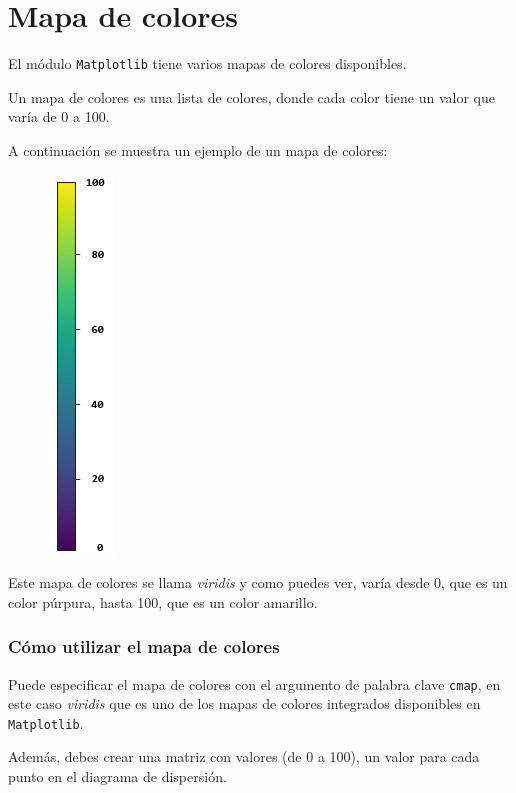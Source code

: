 \section{Mapa de colores}

El módulo \texttt{Matplotlib} tiene varios mapas de colores disponibles.

Un mapa de colores es una lista de colores, donde cada color tiene un
valor que varía de 0 a 100.

A continuación se muestra un ejemplo de un mapa de colores:
\begin{figure}
  \centering
  \includegraphics[scale=0.6]{img/img_colorbar.png}
\end{figure}


Este mapa de colores se llama
\emph{\textquotesingle viridis\textquotesingle{}} y como puedes ver,
varía desde 0, que es un color púrpura, hasta 100, que es un color
amarillo.

\subsubsection{Cómo utilizar el mapa de colores}

Puede especificar el mapa de colores con el argumento de palabra clave
\texttt{cmap}, en este caso
\emph{\textquotesingle viridis\textquotesingle{}} que es uno de los
mapas de colores integrados disponibles en \texttt{Matplotlib}.

Además, debes crear una matriz con valores (de 0 a 100), un valor para
cada punto en el diagrama de dispersión.\\

